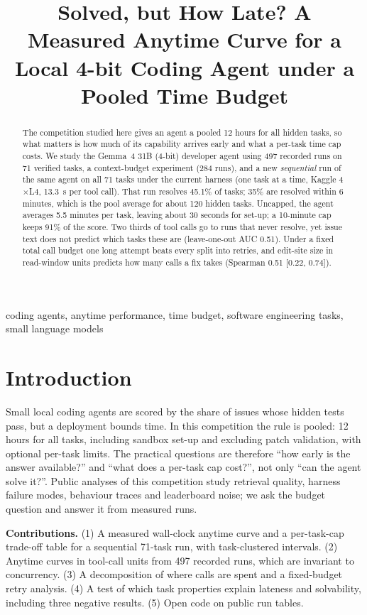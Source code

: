 \documentclass[conference]{IEEEtran}
\title{Solved, but How Late? A Measured Anytime Curve for a Local 4-bit Coding Agent under a Pooled Time Budget}
\author{\IEEEauthorblockN{Abhijna DS}
\IEEEauthorblockA{PES University, Bangalore, India\\
Draft v0.3, 14 October 2026}}
\begin{document}
\maketitle
\begin{abstract}
The competition studied here gives an agent a pooled 12 hours for all hidden tasks, so what matters is how much of its capability arrives early and what a per-task time cap costs. We study the Gemma~4 31B (4-bit) developer agent using 497 recorded runs on 71 verified tasks, a context-budget experiment (284 runs), and a new \emph{sequential} run of the same agent on all 71 tasks under the current harness (one task at a time, Kaggle 4$\times$L4, 13.3~s per tool call). That run resolves 45.1\% of tasks; 35\% are resolved within 6 minutes, which is the pool average for about 120 hidden tasks. Uncapped, the agent averages 5.5 minutes per task, leaving about 30 seconds for set-up; a 10-minute cap keeps 91\% of the score. Two thirds of tool calls go to runs that never resolve, yet issue text does not predict which tasks these are (leave-one-out AUC 0.51). Under a fixed total call budget one long attempt beats every split into retries, and edit-site size in read-window units predicts how many calls a fix takes (Spearman 0.51 [0.22, 0.74]).
\end{abstract}

\begin{IEEEkeywords}
coding agents, anytime performance, time budget, software engineering tasks, small language models
\end{IEEEkeywords}

\section{Introduction}
Small local coding agents are scored by the share of issues whose hidden tests pass, but a deployment bounds time. In this competition the rule is pooled: 12 hours for all tasks, including sandbox set-up and excluding patch validation, with optional per-task limits. The practical questions are therefore ``how early is the answer available?'' and ``what does a per-task cap cost?'', not only ``can the agent solve it?''. Public analyses of this competition study retrieval quality, harness failure modes, behaviour traces and leaderboard noise; we ask the budget question and answer it from measured runs.

\textbf{Contributions.} (1) A measured wall-clock anytime curve and a per-task-cap trade-off table for a sequential 71-task run, with task-clustered intervals. (2) Anytime curves in tool-call units from 497 recorded runs, which are invariant to concurrency. (3) A decomposition of where calls are spent and a fixed-budget retry analysis. (4) A test of which task properties explain lateness and solvability, including three negative results. (5) Open code on public run tables.
\end{document}
